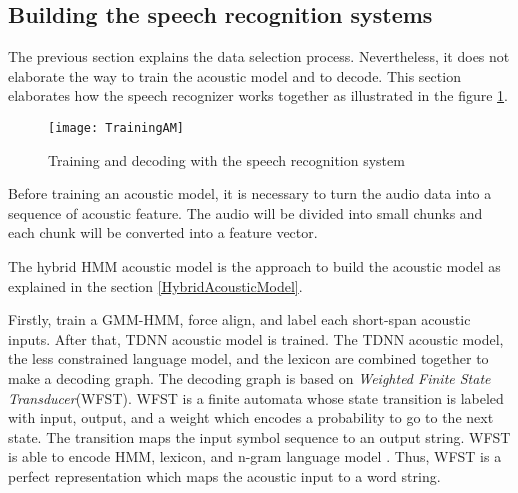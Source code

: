 \subsection{Building the speech recognition systems}
The previous section explains the data selection process. Nevertheless, it does not elaborate the way to train the acoustic model and to decode. This section elaborates how the speech recognizer works together as illustrated in the figure \ref{ASRchart}.

\begin{figure}[H]
\caption{Training and decoding with the speech recognition system}
\label{ASRchart}
\texttt{[image: TrainingAM]} 
\centering
\end{figure}

Before training an acoustic model, it is necessary to turn the audio data into a sequence of acoustic feature. The audio will be divided into small chunks and each chunk will be converted into a feature vector. 

The hybrid HMM acoustic model is the approach to build the acoustic model as explained in the section \ref{HybridAcousticModel}.  


Firstly, train a GMM-HMM, force align, and label each short-span acoustic inputs. After that, TDNN acoustic model is trained. The TDNN acoustic model, the less constrained language model, and the lexicon are combined together to make a decoding graph. The decoding graph is based on \textit{Weighted Finite State Transducer}(WFST). WFST is a finite automata whose state transition is labeled with input, output, and a weight which encodes a probability to go to the next state. The transition maps the input symbol sequence to an output string. WFST is able to encode HMM, lexicon, and n-gram language model \cite{Mohri2008}. Thus, WFST is a perfect representation which maps the acoustic input to a word string. 

